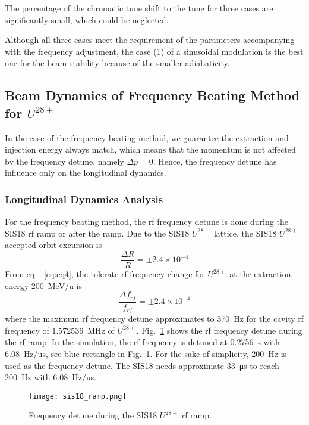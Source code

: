 The percentage of the chromatic tune shift to the tune for three cases are significantly small, which could be neglected.

Although all three cases meet the requirement of the parameters accompanying with the frequency adjustment, the case (1) of a sinusoidal modulation is the best one for the beam stability because of the smaller adiabaticity.  
\subsection{Beam Dynamics of Frequency Beating Method for $U^\mathit{28+}$} 
In the case of the frequency beating method, we guarantee the extraction and injection energy always match, which means that the momentum is not affected by the frequency detune, namely $\Delta p = 0$. Hence, the frequency detune has influence only on the longitudinal dynamics.

\subsubsection{Longitudinal Dynamics Analysis}
For the frequency beating method, the rf frequency detune is done during the SIS18 rf ramp or after the ramp. Due to the SIS18 $U^\mathit{28+}$ lattice, the SIS18 $U^\mathit{28+}$ accepted orbit excursion is~\cite{liebermann_fair_2013}
\begin{equation}
\frac{\Delta{R}}{R} = \pm 2.4 \times 10^{-4}
\end{equation}
From eq. ~\ref{eq:eq4}, the tolerate rf frequency change for $U^{28+}$ at the extraction energy \SI{200}{MeV/u} is
\begin{equation}
\frac{\Delta{f}_\mathit{rf}}{f_\mathit{rf}} = \pm 2.4 \times 10^{-4}
\end{equation}
where the maximum rf frequency detune approximates to \SI{370}{Hz} for the cavity rf frequency of \SI{1.572536}{MHz} of $U^{ 28+}$. Fig.~\ref{sis18_ramp} shows the rf frequency detune during the rf ramp. In the simulation, the rf frequency is detuned at \SI{0.2756}{s} with \SI{6.08}{Hz/us}, see blue rectangle in Fig.~\ref{sis18_ramp}. For the sake of simplicity, \SI{200}{Hz} is used as the frequency detune. The SIS18 needs approximate \SI{33}{\micro\second} to reach \SI{200}{Hz} with \SI{6.08}{Hz/us}.
\begin{figure}[!htb]
   \centering   
   \texttt{[image: sis18\_ramp.png]}
   \caption{Frequency detune during the SIS18 $U^{28+}$ rf ramp.}
   \label{sis18_ramp}
\end{figure}

